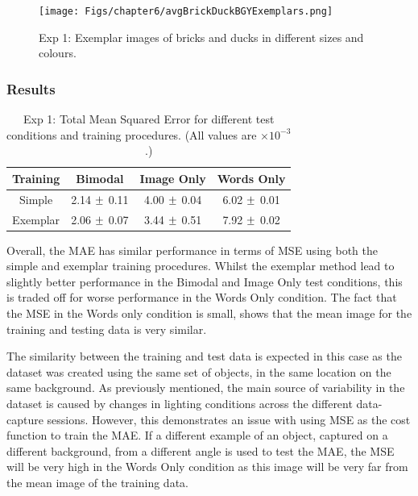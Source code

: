 \begin{figure}[ht]
    \centering
    \texttt{[image: Figs/chapter6/avgBrickDuckBGYExemplars.png]}
    \caption{Exp 1: Exemplar images of bricks and ducks in different sizes and colours.}
    \label{fig:ExmBrickDuck}
\end{figure}

\subsubsection{Results}

\begin{table}[h!]
\centering
	\begin{tabular}{|c|c|c|c|}
	\hline
\textbf{Training} & 	\textbf{Bimodal} & 	\textbf{Image Only} 	& 	\textbf{Words Only} \\ \hline
Simple & 2.14 $\mypm$ 0.11 & 4.00	$\mypm$ 0.04 & 6.02 $\mypm$ 	0.01 \\ \hline
Exemplar & 2.06 $\mypm$ 0.07 & 3.44 $\mypm$ 0.51 & 7.92	$\mypm$ 0.02 \\ \hline
\end{tabular}
\caption{Exp 1: Total Mean Squared Error for different test conditions and training procedures. (All values are $\times10^{-3}$.)}
\label{tab:6_res_exp1}
\end{table}

Overall, the \ac{MAE} has similar performance in terms of \ac{MSE} using both the simple and exemplar training procedures. Whilst the exemplar method lead to slightly better performance in the Bimodal and Image Only test conditions, this is traded off for worse performance in the Words Only condition. The fact that the \ac{MSE} in the Words only condition is small, shows that the mean image for the training and testing data is very similar.

The similarity between the training and test data is expected in this case as the dataset was created using the same set of objects, in the same location on the same background. As previously mentioned, the main source of variability in the dataset is caused by changes in lighting conditions across the different data-capture sessions. However, this demonstrates an issue with using \ac{MSE} as the cost function to train the \ac{MAE}. If a different example of an object, captured on a different background, from a different angle is used to test the \ac{MAE}, the \ac{MSE} will be very high in the Words Only condition as this image will be very far from the mean image of the training data.

